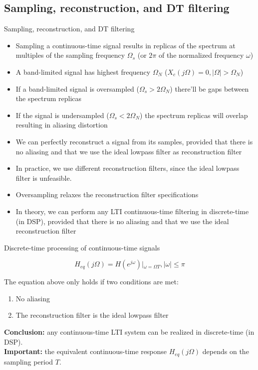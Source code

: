 \documentclass[10pt, aspectratio=169]{beamer}
\begin{document}
%
\subsection{Sampling, reconstruction, and DT filtering}
\begin{frame}{Sampling, reconstruction, and DT filtering}
\begin{itemize}
	\item Sampling a continuous-time signal results in replicas of the spectrum at multiples of the sampling frequency $\Omega_s$ (or $2\pi$ of the normalized frequency $\omega$)
	\item A band-limited signal has highest frequency $\Omega_N$ ($X_c(j\Omega) = 0, |\Omega| > \Omega_N$)
	\item If a band-limited signal is oversampled ($\Omega_s > 2\Omega_N$) there'll be gaps between the spectrum replicas
	\item If the signal is undersampled ($\Omega_s < 2\Omega_N$) the spectrum replicas will overlap resulting in aliasing distortion
	\item We can perfectly reconstruct a signal from its samples, provided that there is no aliasing and that we use the ideal lowpass filter as reconstruction filter
	\item In practice, we use different reconstruction filters, since the ideal lowpass filter is unfeasible.
	\item Oversampling relaxes the reconstruction filter specifications
	\item In theory, we can perform any LTI continuous-time filtering in discrete-time (in DSP), provided that there is no aliasing and that we use the ideal reconstruction filter
\end{itemize}
\end{frame}

%
\begin{frame}{Discrete-time processing of continuous-time signals}
\vspace{-0.5cm}
\begin{center}
	\def\Heff{1}
	\resizebox{0.7\linewidth}{!}{}
\end{center}

\begin{equation*}
H_{eq}(j\Omega) = H(e^{j\omega})|_{\omega = \Omega T}, |\omega| \leq \pi
\end{equation*}

The equation above only holds if two conditions are met:
\begin{enumerate}
	\item No aliasing
	\item The reconstruction filter is the ideal lowpass filter
\end{enumerate}
\textbf{Conclusion:} any continuous-time LTI system can be realized in discrete-time (in DSP).\\
\textbf{Important:} the equivalent continuous-time response $H_{eq}(j\Omega)$ depends on the sampling period $T$.
\end{frame}
\end{document}
